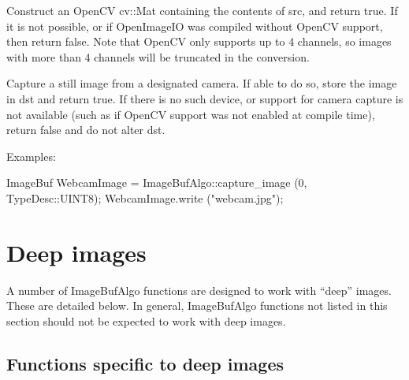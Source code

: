 \apiend


 
Construct an OpenCV {\cf cv::Mat} containing the contents of \ImageBuf src,
and return true. If it is not possible, or if OpenImageIO was compiled
without OpenCV support, then return false. Note that OpenCV only supports up
to 4 channels, so images with more than 4 channels will be truncated in the
conversion.

\apiend


 
Capture a still image from a designated camera.  If able to do so,
store the image in {\cf dst} and return {\cf true}.  If there is no such device,
or support for camera capture is not available (such as if OpenCV
support was not enabled at compile time), return {\cf false} and do not
alter {\cf dst}.

\smallskip
\noindent Examples:
\begin{code}
    ImageBuf WebcamImage = ImageBufAlgo::capture_image (0, TypeDesc::UINT8);
    WebcamImage.write ("webcam.jpg");
\end{code}
\apiend



\section{Deep images}
\label{sec:iba:deep}

A number of {\cf ImageBufAlgo} functions are designed to work with ``deep''
images. These are detailed below. In general, {\cf ImageBufAlgo} functions
not listed in this section should not be expected to work with deep images.

\subsection{Functions specific to deep images}

